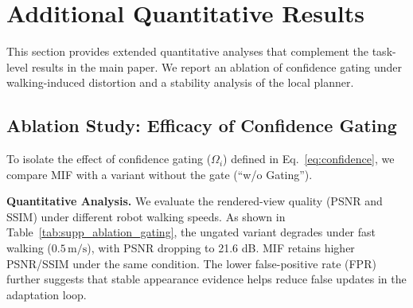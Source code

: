\documentclass[conference]{IEEEtran}
\begin{document}
\section{Additional Quantitative Results}
\label{sec:add_experiments}

This section provides extended quantitative analyses that complement the task-level results in the main paper. We report an ablation of confidence gating under walking-induced distortion and a stability analysis of the local planner.

\subsection{Ablation Study: Efficacy of Confidence Gating}
\label{sec:ablation_study}

To isolate the effect of confidence gating ($\Omega_i$) defined in Eq.~\ref{eq:confidence}, we compare MIF with a variant without the gate (``w/o Gating'').


\textbf{Quantitative Analysis.} We evaluate the rendered-view quality (PSNR and SSIM) under different robot walking speeds. As shown in Table~\ref{tab:supp_ablation_gating}, the ungated variant degrades under fast walking ($0.5\,\text{m/s}$), with PSNR dropping to 21.6 dB. MIF retains higher PSNR/SSIM under the same condition. The lower false-positive rate (FPR) further suggests that stable appearance evidence helps reduce false updates in the adaptation loop.


\begin{table}[h]
\centering
\caption{\textbf{Extended ablation of confidence gating under walking motion.}}
\label{tab:supp_ablation_gating}
\end{table}
\end{document}
